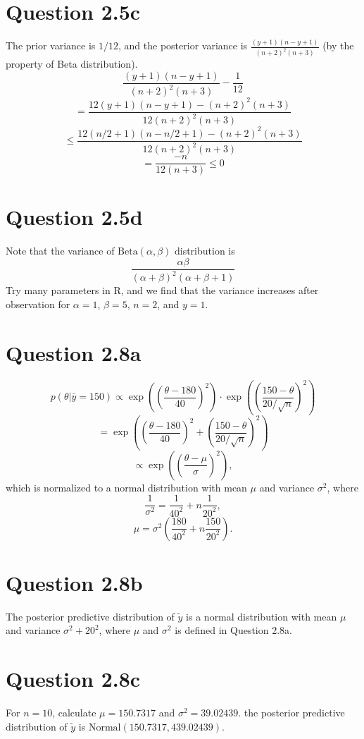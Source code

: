 \documentclass{article}
\begin{document}
\section*{Question 2.5c}
{
    The prior variance is $1/12$, and the posterior variance is $\frac{(y+1)(n-y+1)}{(n+2)^2 (n+3)}$ (by the property of Beta distribution). 
    $$\frac{(y+1)(n-y+1)}{(n+2)^2 (n+3)} - \frac{1}{12}$$
    $$= \frac{12 (y+1)(n-y+1) - (n+2)^2 (n+3)}{12 (n+2)^2 (n+3)}$$
    $$\le \frac{12 (n/2+1)(n-n/2+1) - (n+2)^2 (n+3)}{12 (n+2)^2 (n+3)}$$
    $$= \frac{-n}{12(n+3)} \le 0$$
}

\section*{Question 2.5d}
{
    Note that the variance of $\mathrm{Beta}(\alpha, \beta)$ distribution is $$\frac{\alpha \beta}{(\alpha+\beta)^2 (\alpha+\beta+1)}$$ Try many parameters in R, and we find that the variance increases after observation for $\alpha=1$, $\beta=5$, $n=2$, and $y=1$.
}

\section*{Question 2.8a}
{
    $$p(\theta | \bar{y}=150) \propto \exp{((\frac{\theta-180}{40})^2)} \cdot \exp{((\frac{150-\theta}{20/\sqrt{n}})^2)}$$
    $$= \exp{((\frac{\theta-180}{40})^2 + (\frac{150-\theta}{20/\sqrt{n}})^2)}$$
    $$\propto \exp{((\frac{\theta-\mu}{\sigma})^2)},$$
    which is normalized to a normal distribution with mean $\mu$ and variance $\sigma^2$, where 
    $$\frac{1}{\sigma^2} = \frac{1}{40^2} + n \frac{1}{20^2},$$
    $$\mu = \sigma^2 (\frac{180}{40^2} + n \frac{150}{20^2}).$$
}

\section*{Question 2.8b}
{
    The posterior predictive distribution of $\widetilde{y}$ is a normal distribution with mean $\mu$ and variance $\sigma^2 + 20^2$, where $\mu$ and $\sigma^2$ is defined in Question 2.8a.
}

\section*{Question 2.8c}
{
    For $n=10$, calculate $\mu = 150.7317$ and $\sigma^2 = 39.02439$. the posterior predictive distribution of $\widetilde{y}$ is $\mathrm{Normal}(150.7317, 439.02439)$.
}
\end{document}
